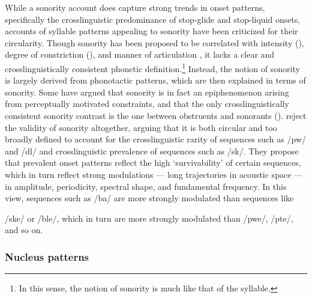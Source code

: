   While a sonority account does capture strong trends in onset patterns, specifically the crosslinguistic predominance of stop-glide and stop-liquid onsets, accounts of syllable patterns appealing to sonority have been criticized for their circularity. Though sonority has been proposed to be correlated with intensity (\citealt{Gordon2002,Parker2002}), degree of constriction (\citealt{Chin1996,Cser2003}), and manner of articulation \citep{Parker2011}, it lacks a clear and crosslinguistically consistent phonetic definition.\footnote{{In this sense, the notion of sonority is much like that of the syllable.}} Instead, the notion of sonority is largely derived from phonotactic patterns, which are then explained in terms of sonority. Some have argued that sonority is in fact an epiphenomenon arising from perceptually motivated constraints, and that the only crosslinguistically consistent sonority contrast is the one between obstruents and sonorants (\citealt{JanyEtAl2007,HenkeEtAl2012}). \citet{OhalaKawasaki-Fukumori1997} reject the validity of sonority altogether, arguing that it is both circular and too broadly defined to account for the crosslinguistic rarity of sequences such as /pw/ and /dl/ and crosslinguistic prevalence of sequences such as /sk/. They propose that prevalent onset patterns reflect the high ‘survivability’ of certain sequences, which in turn reflect strong modulations — long trajectories in acoustic space —  in amplitude, periodicity, spectral shape, and fundamental frequency. In this view, sequences such as /ba/ are more strongly modulated than sequences like 

/ske/ or /ble/, which in turn are more strongly modulated than /pwe/, /pte/, and so on.

\subsubsection{{Nucleus} {patterns}}\label{sec:1.1.2.4}

